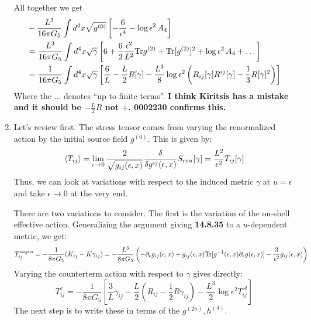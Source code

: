 \documentclass[11pt, class=article, crop=false]{standalone}
\begin{document}
\begin{enumerate}
	All together we get
	\[
	\begin{aligned}
		&-\frac{L^3}{16 \pi G_5} \int d^4 x \sqrt{g^{(0)}} \left[-\frac{6}{\epsilon^4} - \log \epsilon^2 \, A_4\right]\\
		& = \frac{L^3}{16 \pi G_5} \int d^4 x \sqrt{\gamma} \left[6 + \frac{6}{2} \frac{\epsilon^2}{L^2} \mathrm{Tr} g^{(2)}  + \mathrm{Tr}[ g^{(2)}]^2  + \log \epsilon^2 \, A_4 + \dots \right]\\
		&=  \frac{1}{16 \pi G_5} \int d^4 x \sqrt{\gamma} \left[\frac{6}{L} - \frac{L}{2} R[\gamma] - \frac{L^3}{8} \log \epsilon^2 \left(R_{ij}[\gamma] R^{ij}[\gamma] - \frac13 R[\gamma]^2 \right) \right]
	\end{aligned}
	\]
	Where the $\dots$ denotes ``up to finite terms''. \textbf{I think Kiritsis has a mistake and it should be $-\frac{L}{2} R$ not $+$. 0002230 confirms this.}

	\item Let's review first. The stress tensor comes from varying the renormalized action by the initial source field $g^{(0)}$. This is given by:
	\[
		\braket{T_{ij}} = \lim_{\epsilon \to 0} \frac{2}{\sqrt {g_{ij}(\epsilon, x)}} \frac{\delta}{\delta g^{ij}(\epsilon, x)} S_{ren}[\gamma] = \frac{L^2}{\epsilon^2} T_{ij}[\gamma]
	\]
	Thus, we can look at variations with respect to the induced metric $\gamma$ at $u = \epsilon$ and take $\epsilon \to 0$ at the very end. 
	
	There are two variations to consider. The first is the variation of the on-shell effective action. Generalizing the argument giving \textbf{14.8.35} to a $u$-dependent metric, we get:
	\[
		T^{sugra}_{ij} = -\frac{1}{8 \pi G_5} (K_{ij} - K \gamma_{ij}) = -\frac{L^3}{8 \pi G_5} \left(-\partial_\epsilon g_{ij}(\epsilon, x) + g_{ij}(\epsilon, x) \mathrm{Tr}[g^{-1}(\epsilon, x) \partial_\epsilon g(\epsilon, x)] - \frac{3}{\epsilon^2} g_{ij}(\epsilon, x) \right)
	\]
	Varying the counterterm action with respect to $\gamma$ gives directly:
	\[
		T^{c}_{ij} = - \frac{1}{8 \pi G_5} \left[\frac{3}{L} \gamma_{ij} - \frac{L}{2} \left(R_{ij} - \frac12 R \gamma_{ij} \right) - \frac{L^3}{2} \log{\epsilon^2} T^{\mathcal A}_{ij} \right]
	\]
	The next step is to write these in terms of the $g^{(2n)}, h^{(4)}$.
	

\end{enumerate}
\end{document}
